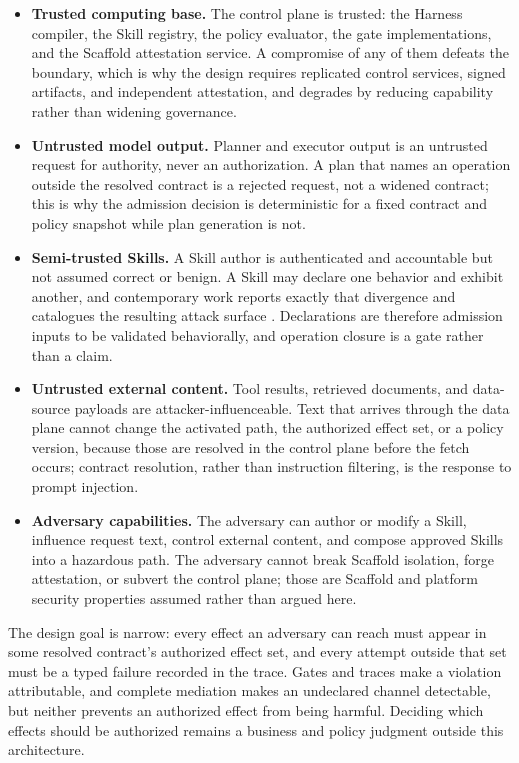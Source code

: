 \begin{itemize}
\item \textbf{Trusted computing base.} The control plane is trusted: the Harness compiler, the Skill registry, the policy evaluator, the gate implementations, and the Scaffold attestation service. A compromise of any of them defeats the boundary, which is why the design requires replicated control services, signed artifacts, and independent attestation, and degrades by reducing capability rather than widening governance.
\item \textbf{Untrusted model output.} Planner and executor output is an untrusted request for authority, never an authorization. A plan that names an operation outside the resolved contract is a rejected request, not a widened contract; this is why the admission decision is deterministic for a fixed contract and policy snapshot while plan generation is not.
\item \textbf{Semi-trusted Skills.} A Skill author is authenticated and accountable but not assumed correct or benign. A Skill may declare one behavior and exhibit another, and contemporary work reports exactly that divergence \cite{zhang2026misalignment} and catalogues the resulting attack surface \cite{badhe2026skillsecurity}. Declarations are therefore admission inputs to be validated behaviorally, and operation closure is a gate rather than a claim.
\item \textbf{Untrusted external content.} Tool results, retrieved documents, and data-source payloads are attacker-influenceable. Text that arrives through the data plane cannot change the activated path, the authorized effect set, or a policy version, because those are resolved in the control plane before the fetch occurs; contract resolution, rather than instruction filtering, is the response to prompt injection.
\item \textbf{Adversary capabilities.} The adversary can author or modify a Skill, influence request text, control external content, and compose approved Skills into a hazardous path. The adversary cannot break Scaffold isolation, forge attestation, or subvert the control plane; those are Scaffold and platform security properties assumed rather than argued here.
\end{itemize}

The design goal is narrow: every effect an adversary can reach must appear in some resolved contract's authorized effect set, and every attempt outside that set must be a typed failure recorded in the trace. Gates and traces make a violation attributable, and complete mediation makes an undeclared channel detectable, but neither prevents an authorized effect from being harmful. Deciding which effects should be authorized remains a business and policy judgment outside this architecture.

